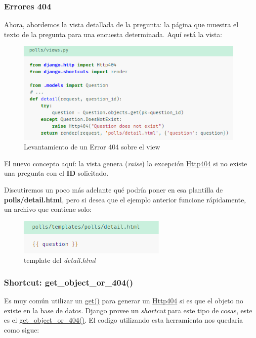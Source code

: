 \documentclass[10pt]{article}
\newcommand{\django}[1]{{\textcolor{G}{Django} #1}}
\begin{document}
\subsubsection{Errores 404}

Ahora, abordemos la vista detallada de la pregunta: la página que muestra el texto de la pregunta para una encuesta determinada. Aquí está la vista:

\begin{figure}[H]
\begin{center}
\includegraphics[scale=1]{figuras/3/33/334/img1.png}
\caption{Levantamiento de un Error 404 sobre el view}
\end{center}
\end{figure}


El nuevo concepto aquí: la vista genera (\textit{raise}) la excepción {\href{https://docs.djangoproject.com/en/3.0/topics/http/views/\#django.http.Http404}{\textcolor{B}{Http404}}}
 si no existe una pregunta con el \textbf{ID} solicitado.

Discutiremos un poco más adelante qué podría poner en esa plantilla de \textbf{polls/detail.html}, pero si desea que el ejemplo anterior funcione rápidamente, un archivo que contiene solo:

\begin{figure}[H]
\begin{center}
\includegraphics[scale=1]{figuras/3/33/334/img2.png}
\caption{template del \textit{detail.html}}
\end{center}
\end{figure}

\subsubsection*{Shortcut: \textcolor{R}{get\_object\_or\_404()}}
Es muy común utilizar  un  {\href{https://docs.djangoproject.com/en/3.0/ref/models/querysets/\#django.db.models.query.QuerySet.get}{\textcolor{B}{get()}}} para generar un {\href{https://docs.djangoproject.com/en/3.0/topics/http/views/\#django.http.Http404}{\textcolor{B}{Http404}}} si es que el objeto no existe en la base de datos. \django{} provee un \textit{shortcut} para este tipo de cosas, este es el {\href{https://docs.djangoproject.com/en/3.0/topics/http/shortcuts/\#django.shortcuts.get\_object\_or\_404}{\textcolor{B}{get\_object\_or\_404()}}}. El codigo utilizando esta herramienta nos quedaria como sigue:
\end{document}
